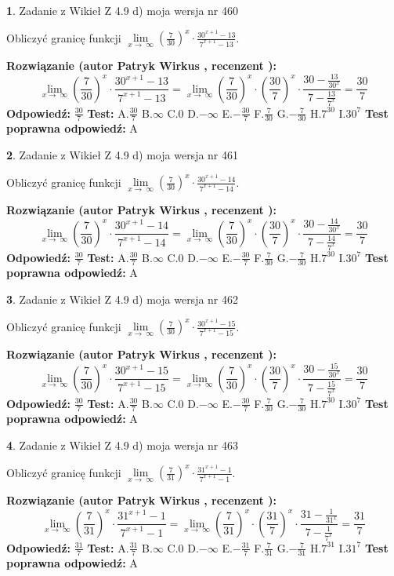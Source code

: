\documentclass[12pt, a4paper]{article}
\theoremstyle{definition} %
\newtheorem{zad}{}
\newcommand{\zadStart}[1]{\begin{zad}#1\newline}
\newcommand{\zadStop}{\end{zad}}
\newcommand{\rozwStart}[2]{\noindent \textbf{Rozwiązanie (autor #1 , recenzent #2): }\newline}
\newcommand{\rozwStop}{\newline}
\newcommand{\odpStart}{\noindent \textbf{Odpowiedź:}\newline}
\newcommand{\odpStop}{\newline}
\newcommand{\testStart}{\noindent \textbf{Test:}\newline}
\newcommand{\testStop}{\newline}
\newcommand{\kluczStart}{\noindent \textbf{Test poprawna odpowiedź:}\newline}
\newcommand{\kluczStop}{\newline}
\begin{document}
\zadStart{Zadanie z Wikieł Z 4.9 d) moja wersja nr 460}


Obliczyć granicę funkcji  $\lim\limits_{x\to\ \infty}(\frac{7}{30})^{x}\cdot\frac{30^{x+1}-13}{7^{x+1}-13}$.
\zadStop
\rozwStart{Patryk Wirkus}{}
$$\lim\limits_{x\to\ \infty}(\frac{7}{30})^{x}\cdot\frac{30^{x+1}-13}{7^{x+1}-13}=\lim\limits_{x\to\ \infty}(\frac{7}{30})^{x}\cdot(\frac{30}{7})^{x} \cdot \frac{30-\frac{13}{30^{x}}}{7-\frac{13}{7^{x}}} = \frac{30}{7}$$
\rozwStop
\odpStart
$\frac{30}{7}$
\odpStop
\testStart
A.$\frac{30}{7}$ B.$\infty$ C.$0$ D.$-\infty$ E.$-\frac{30}{7}$
F.$\frac{7}{30}$ G.$-\frac{7}{30}$
H.$7^{30}$
I.$30^{7}$
\testStop
\kluczStart
A
\kluczStop



\zadStart{Zadanie z Wikieł Z 4.9 d) moja wersja nr 461}


Obliczyć granicę funkcji  $\lim\limits_{x\to\ \infty}(\frac{7}{30})^{x}\cdot\frac{30^{x+1}-14}{7^{x+1}-14}$.
\zadStop
\rozwStart{Patryk Wirkus}{}
$$\lim\limits_{x\to\ \infty}(\frac{7}{30})^{x}\cdot\frac{30^{x+1}-14}{7^{x+1}-14}=\lim\limits_{x\to\ \infty}(\frac{7}{30})^{x}\cdot(\frac{30}{7})^{x} \cdot \frac{30-\frac{14}{30^{x}}}{7-\frac{14}{7^{x}}} = \frac{30}{7}$$
\rozwStop
\odpStart
$\frac{30}{7}$
\odpStop
\testStart
A.$\frac{30}{7}$ B.$\infty$ C.$0$ D.$-\infty$ E.$-\frac{30}{7}$
F.$\frac{7}{30}$ G.$-\frac{7}{30}$
H.$7^{30}$
I.$30^{7}$
\testStop
\kluczStart
A
\kluczStop



\zadStart{Zadanie z Wikieł Z 4.9 d) moja wersja nr 462}


Obliczyć granicę funkcji  $\lim\limits_{x\to\ \infty}(\frac{7}{30})^{x}\cdot\frac{30^{x+1}-15}{7^{x+1}-15}$.
\zadStop
\rozwStart{Patryk Wirkus}{}
$$\lim\limits_{x\to\ \infty}(\frac{7}{30})^{x}\cdot\frac{30^{x+1}-15}{7^{x+1}-15}=\lim\limits_{x\to\ \infty}(\frac{7}{30})^{x}\cdot(\frac{30}{7})^{x} \cdot \frac{30-\frac{15}{30^{x}}}{7-\frac{15}{7^{x}}} = \frac{30}{7}$$
\rozwStop
\odpStart
$\frac{30}{7}$
\odpStop
\testStart
A.$\frac{30}{7}$ B.$\infty$ C.$0$ D.$-\infty$ E.$-\frac{30}{7}$
F.$\frac{7}{30}$ G.$-\frac{7}{30}$
H.$7^{30}$
I.$30^{7}$
\testStop
\kluczStart
A
\kluczStop



\zadStart{Zadanie z Wikieł Z 4.9 d) moja wersja nr 463}


Obliczyć granicę funkcji  $\lim\limits_{x\to\ \infty}(\frac{7}{31})^{x}\cdot\frac{31^{x+1}-1}{7^{x+1}-1}$.
\zadStop
\rozwStart{Patryk Wirkus}{}
$$\lim\limits_{x\to\ \infty}(\frac{7}{31})^{x}\cdot\frac{31^{x+1}-1}{7^{x+1}-1}=\lim\limits_{x\to\ \infty}(\frac{7}{31})^{x}\cdot(\frac{31}{7})^{x} \cdot \frac{31-\frac{1}{31^{x}}}{7-\frac{1}{7^{x}}} = \frac{31}{7}$$
\rozwStop
\odpStart
$\frac{31}{7}$
\odpStop
\testStart
A.$\frac{31}{7}$ B.$\infty$ C.$0$ D.$-\infty$ E.$-\frac{31}{7}$
F.$\frac{7}{31}$ G.$-\frac{7}{31}$
H.$7^{31}$
I.$31^{7}$
\testStop
\kluczStart
A
\kluczStop
\end{document}
